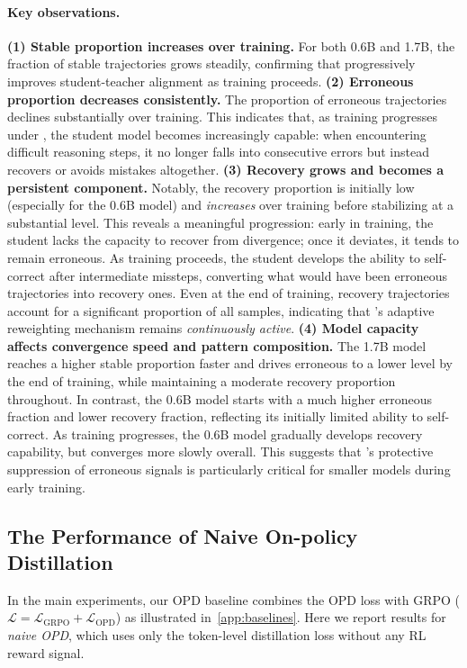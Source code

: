 \paragraph{Key observations.}
\textbf{(1) Stable proportion increases over training.} For both 0.6B and 1.7B, the fraction of stable trajectories grows steadily, confirming that \ourmodel progressively improves student-teacher alignment as training proceeds.
\textbf{(2) Erroneous proportion decreases consistently.} The proportion of erroneous trajectories declines substantially over training. This indicates that, as training progresses under \ourmodel, the student model becomes increasingly capable: when encountering difficult reasoning steps, it no longer falls into consecutive errors but instead recovers or avoids mistakes altogether.
\textbf{(3) Recovery grows and becomes a persistent component.} Notably, the recovery proportion is initially low (especially for the 0.6B model) and \emph{increases} over training before stabilizing at a substantial level. This reveals a meaningful progression: early in training, the student lacks the capacity to recover from divergence; once it deviates, it tends to remain erroneous. As training proceeds, the student develops the ability to self-correct after intermediate missteps, converting what would have been erroneous trajectories into recovery ones. Even at the end of training, recovery trajectories account for a significant proportion of all samples, indicating that \ourmodel's adaptive reweighting mechanism remains \emph{continuously active}.
\textbf{(4) Model capacity affects convergence speed and pattern composition.} The 1.7B model reaches a higher stable proportion faster and drives erroneous to a lower level by the end of training, while maintaining a moderate recovery proportion throughout. In contrast, the 0.6B model starts with a much higher erroneous fraction and lower recovery fraction, reflecting its initially limited ability to self-correct. As training progresses, the 0.6B model gradually develops recovery capability, but converges more slowly overall. This suggests that \ourmodel's protective suppression of erroneous signals is particularly critical for smaller models during early training.


\subsection{The Performance of Naive On-policy Distillation}
\label{app:naive_opd}

In the main experiments, our OPD baseline combines the OPD loss with GRPO (\ie $\mathcal{L} = \mathcal{L}_{\mathrm{GRPO}} + \mathcal{L}_{\mathrm{OPD}}$) as illustrated in~\cref{app:baselines}. Here we report results for \textit{naive OPD}, which uses only the token-level distillation loss without any RL reward signal.

